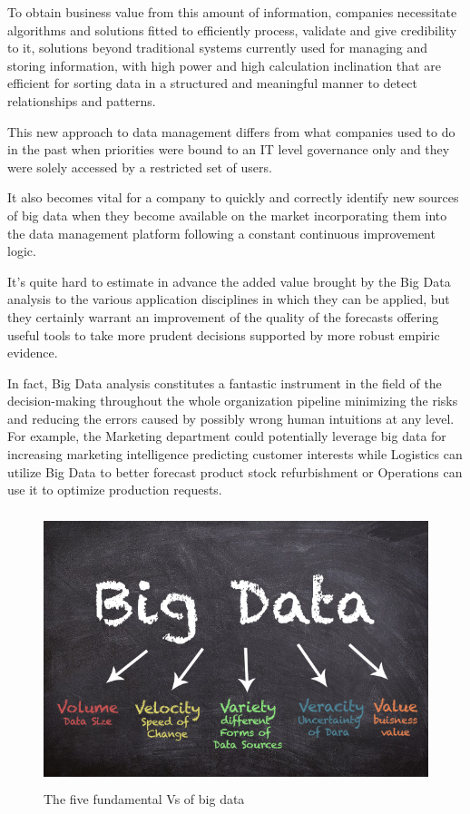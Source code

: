 To obtain business value from this amount of information, companies necessitate algorithms and solutions fitted to efficiently process, validate and give credibility to it, solutions beyond traditional systems currently used for managing and storing information, with high power and high calculation inclination that are efficient for sorting data in a structured and meaningful manner to detect relationships and patterns.

This new approach to data management differs from what companies used to do in the past when priorities were bound to an IT level governance only and they were solely accessed by a restricted set of users. 

It also becomes vital for a company to quickly and correctly identify new sources of big data when they become available on the market incorporating them into the data management platform following a constant continuous improvement logic.

It's quite hard to estimate in advance the added value brought by the Big Data analysis to the various application disciplines in which they can be applied, but they certainly warrant an improvement of the quality of the forecasts offering useful tools to take more prudent decisions supported by more robust empiric evidence.

In fact, Big Data analysis constitutes a fantastic instrument in the field of the decision-making throughout the whole organization pipeline minimizing the risks and reducing the errors caused by possibly wrong human intuitions at any level. For example, the Marketing department could potentially leverage big data for increasing marketing intelligence predicting customer interests while Logistics can utilize Big Data to better forecast product stock refurbishment or Operations can use it to optimize production requests.

\vspace{0.5cm}
\begin{figure}[htbp]
  \centering
    \includegraphics[height=8cm]{images/bigdata.png}
  \caption{The five fundamental Vs of big data }
  \label{fig:bigdata}
\end{figure}
\vspace{0.5cm}

